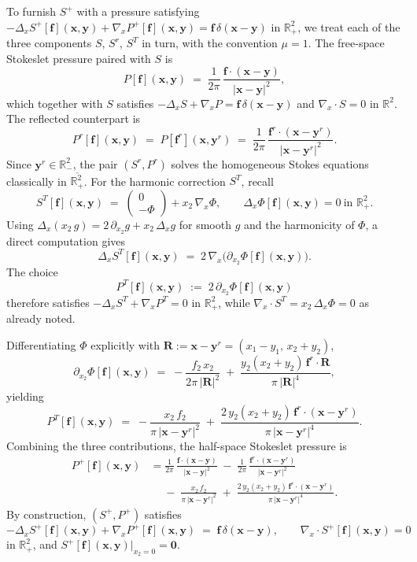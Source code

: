 \documentclass{amsart}
\newcommand{\mx}{\mathbf{x}}
\newcommand{\my}{\mathbf{y}}
\newcommand{\mf}{\mathbf{f}}
\newcommand{\R}{\mathbb{R}}
\newcommand{\p}{\partial}
\begin{document}
 
To furnish $S^+$ with a pressure satisfying
$-\Delta_x S^+[\mf](\mx,\my)+\nabla_x P^+[\mf](\mx,\my)=\mf\,\delta(\mx-\my)$
in $\mathbb{R}^2_+$, we treat each of the three components $S$, $S^r$,
$S^T$ in turn, with the convention $\mu=1$.
The free-space Stokeslet pressure paired with $S$ is
\[
P[\mf](\mx,\my) \;=\; \frac{1}{2\pi}\,\frac{\mf\cdot(\mx-\my)}{|\mx-\my|^2},
\]
which together with $S$ satisfies $-\Delta_x S+\nabla_x P=\mf\,\delta(\mx-\my)$
and $\nabla_x\!\cdot\! S=0$ in $\R^2$. The reflected counterpart is
\[
P^r[\mf](\mx,\my) \;=\; P[\mf^r](\mx,\my^r)
\;=\; \frac{1}{2\pi}\,\frac{\mf^r\cdot(\mx-\my^r)}{|\mx-\my^r|^2}.
\]
Since $\my^r\in\R^2_-$, the pair $(S^r,P^r)$ solves the homogeneous Stokes
equations classically in $\overline{\R^2_+}$.
For the harmonic correction $S^T$, recall
\[
S^T[\mf](\mx,\my) \;=\; \begin{pmatrix}0\\-\Phi\end{pmatrix} + x_2\,\nabla_x\Phi,
\qquad \Delta_x \Phi[\mf](\mx,\my) = 0 \ \text{in }\R^2_+.
\]
Using $\Delta_x(x_2\,g) = 2\,\p_{x_2}g + x_2\,\Delta_x g$ for smooth $g$
and the harmonicity of $\Phi$, a direct computation gives
\[
\Delta_x S^T[\mf](\mx,\my) \;=\; 2\,\nabla_x\!\bigl(\p_{x_2}\Phi[\mf](\mx,\my)\bigr).
\]
The choice
\[
P^T[\mf](\mx,\my) \;:=\; 2\,\p_{x_2}\Phi[\mf](\mx,\my)
\]
therefore satisfies $-\Delta_x S^T+\nabla_x P^T=0$ in $\R^2_+$, while
$\nabla_x\!\cdot\! S^T = x_2\,\Delta_x \Phi = 0$ as already noted.
 
Differentiating $\Phi$ explicitly with $\mathbf{R}:=\mx-\my^r=(x_1-y_1,\,x_2+y_2)$,
\[
\p_{x_2}\Phi[\mf](\mx,\my)
\;=\; -\frac{f_2\,x_2}{2\pi\,|\mathbf{R}|^2}
\;+\; \frac{y_2(x_2+y_2)\,\mf^r\cdot\mathbf{R}}{\pi\,|\mathbf{R}|^4},
\]
yielding
\begin{equation}\label{eq:PT}
P^T[\mf](\mx,\my)
\;=\; -\frac{x_2\,f_2}{\pi\,|\mx-\my^r|^2}
\;+\; \frac{2\,y_2(x_2+y_2)\,\mf^r\cdot(\mx-\my^r)}{\pi\,|\mx-\my^r|^4}.
\end{equation}
Combining the three contributions, the half-space Stokeslet pressure is
\begin{equation}\label{eq:P+}
\begin{split}
P^+[\mf](\mx,\my)
&= \frac{1}{2\pi}\,\frac{\mf\cdot(\mx-\my)}{|\mx-\my|^2}
\;-\; \frac{1}{2\pi}\,\frac{\mf^r\cdot(\mx-\my^r)}{|\mx-\my^r|^2} \\
&\quad\;-\; \frac{x_2\,f_2}{\pi\,|\mx-\my^r|^2}
\;+\; \frac{2\,y_2(x_2+y_2)\,\mf^r\cdot(\mx-\my^r)}{\pi\,|\mx-\my^r|^4}.
\end{split}
\end{equation}
By construction, $(S^+, P^+)$ satisfies
\[
-\Delta_x S^+[\mf](\mx,\my) + \nabla_x P^+[\mf](\mx,\my)
\;=\; \mf\,\delta(\mx-\my),
\qquad \nabla_x\!\cdot\!S^+[\mf](\mx,\my) = 0
\]
in $\R^2_+$, and $S^+[\mf](\mx,\my)\big|_{x_2=0}=\mathbf 0$.
 
\end{document}
